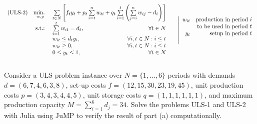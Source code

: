 \begin{align*}
	\begin{array}{lrlr}
		\text{(ULS-2)} & \mini\limits_{w,y} & \multicolumn{2}{c}{\sum \limits_{t \in N} \brackets{f_ty_t + p_t\sum \limits_{i=t}^{n}w_{ti} + q_t\sum\limits_{i=1}^{t}\left(\sum \limits_{j=i}^{n}w_{ij} - d_i\right)}}\\
		               & \st                & \sum \limits_{i=1}^t w_{it} = d_t, &\forall t\in N\\              
		    	       &                    & w_{it} \leq d_t y_i,  			 &\forall i,t\in N : i\leq t\\  
		    	       &                    & w_{it} \geq 0,        			 &\forall i,t\in N : i\leq t\\  
		    	       &                    & 0 \leq y_{t} \leq 1,  			 &\forall t\in N                   
    \end{array}
    \quad~\left|
    \begin{array}{rr}
 	  	w_{it} & \text{production in period } i\\
 	      	   & \text{to be used in period } t\\%
 	       y_t & \text{setup in period } t\\
 	       	   & %
    \end{array}\right.
\end{align*}\\[-20pt]

Consider a ULS problem instance over $N = \{1,\dots,6\}$ periods with demands $d = (6,7,4,6,3,8)$, set-up costs $f = (12,15,30,23,19,45)$, unit production costs $p = (3,4,3,4,4,5)$, unit storage costs \lb $q = (1,1,1,1,1,1)$, and maximum production capacity $M = \sum_{i=1}^6d_j = 34$. Solve the problems ULS-1 and ULS-2 with Julia using JuMP to verify the result of part (a) computationally.
